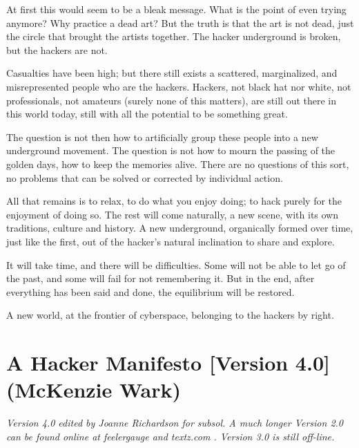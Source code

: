 \documentclass[letterpaper,12pt,english]{sphinxmanual}
\begin{document}
At first this would seem to be a bleak message. What is the point of
even trying anymore? Why practice a dead art? But the truth is that the
art is not dead, just the circle that brought the artists together. The
hacker underground is broken, but the hackers are not.

Casualties have been high; but there still exists a scattered,
marginalized, and misrepresented people who are the hackers. Hackers,
not black hat nor white, not professionals, not amateurs (surely none
of this matters), are still out there in this world today, still with
all the potential to be something great.

The question is not then how to artificially group these people into a
new underground movement. The question is not how to mourn the passing of
the golden days, how to keep the memories alive. There are no questions
of this sort, no problems that can be solved or corrected by individual
action.

All that remains is to relax, to do what you enjoy doing; to hack purely
for the enjoyment of doing so. The rest will come naturally, a new
scene, with its own traditions, culture and history. A new underground,
organically formed over time, just like the first, out of the hacker's
natural inclination to share and explore.

It will take time, and there will be difficulties. Some will not be able
to let go of the past, and some will fail for not remembering it. But
in the end, after everything has been said and done, the equilibrium
will be restored.

A new world, at the frontier of cyberspace, belonging to the hackers
by right.


\chapter{A Hacker Manifesto {[}Version 4.0{]} (McKenzie Wark)}
\label{wark::doc}\label{wark:a-hacker-manifesto-version-4-0-mckenzie-wark}
\emph{Version 4.0 edited by Joanne Richardson for subsol. A much longer Version 2.0 can be found online at feelergauge and textz.com . Version 3.0 is still off-line.}
\end{document}
